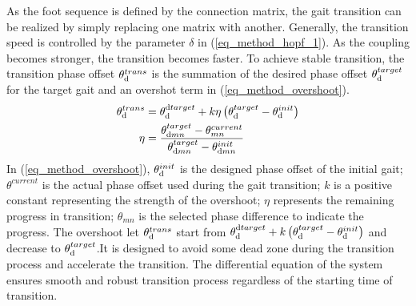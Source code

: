 \documentclass[letterpaper, 10 pt, journal, twoside]{IEEEtran} %
\begin{document}
As the foot sequence is defined by the connection matrix, the gait transition can be realized by simply replacing one matrix with another. Generally, the transition speed is controlled by the parameter $\delta$ in (\ref{eq_method_hopf_1}). As the coupling becomes stronger, the transition becomes faster. To achieve stable transition, the transition phase offset ${\theta}^{trans}_{\rm d}$ is the summation of the desired phase offset ${\theta}^{target}_{\rm d}$ for the target gait and an overshot term\cite{7090642} in (\ref{eq_method_overshoot}).
\begin{eqnarray}
	\label{eq_method_overshoot}
	\begin{aligned}
		{\theta}^{trans}_{\rm d}&={\theta}^{{\rm d}target}_{\rm d} +
		k\eta \left({\theta}^{target}_{\rm d} - {\theta}^{init}_{\rm d}\right) \\
		\eta&=\frac{\theta_{{\rm d}mn}^{target}-\theta_{mn}^{current}}{{\theta}_{{\rm d}mn}^{target}-{\theta}_{{\rm d}mn}^{init}}
	\end{aligned}
\end{eqnarray}
In (\ref{eq_method_overshoot}), ${\theta}^{init}_{\rm d}$ is the designed phase offset of the initial gait; ${\theta}^{current}$ is the actual phase offset used during the gait transition; $k$ is a positive constant representing the strength of the overshoot; $\eta$ represents the remaining progress in transition; $\theta_{mn}$ is the selected phase difference to indicate the progress. The overshoot let $\theta^{trans}_{\rm d}$ start from ${\theta}^{{\rm d}target}_{\rm d}+k\left({\theta}^{target}_{\rm d} - {\theta}^{init}_{\rm d}\right)$ and decrease to $\theta^{target}_{\rm d}$.It is designed to avoid some dead zone during the transition process and accelerate the transition. The differential equation of the system ensures smooth and robust transition process regardless of the starting time of transition.
\end{document}
